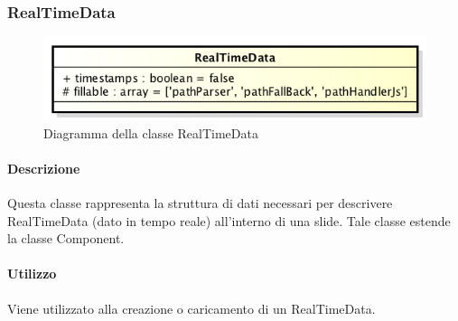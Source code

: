 \subsubsection{RealTimeData}

	\begin{figure}[h]
		\centering
		\includegraphics[width=0.5\linewidth]{img/back_end_premi_model_realTimeData}
		\caption[Diagramma della classe RealTimeData]{Diagramma della classe RealTimeData}
		\label{fig:back_end_premi_model_realTimeData}
	\end{figure}


	\paragraph{Descrizione}
	Questa classe rappresenta la struttura di dati necessari per descrivere RealTimeData (dato in tempo reale) all'interno di una \gls{slide}. Tale classe estende la classe Component.
	
	\paragraph{Utilizzo}
	Viene utilizzato alla creazione o caricamento di un RealTimeData.
	
